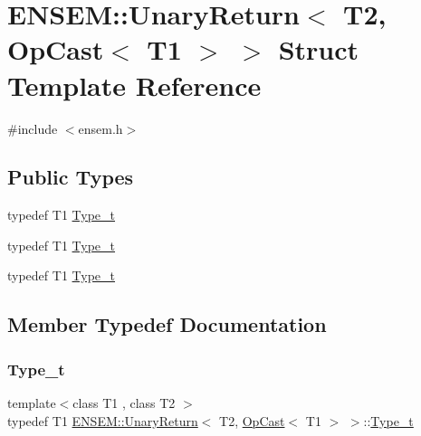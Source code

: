 \hypertarget{structENSEM_1_1UnaryReturn_3_01T2_00_01OpCast_3_01T1_01_4_01_4}{}\section{E\+N\+S\+EM\+:\+:Unary\+Return$<$ T2, Op\+Cast$<$ T1 $>$ $>$ Struct Template Reference}
\label{structENSEM_1_1UnaryReturn_3_01T2_00_01OpCast_3_01T1_01_4_01_4}


{\ttfamily \#include $<$ensem.\+h$>$}

\subsection*{Public Types}
\begin{DoxyCompactItemize}
\item 
typedef T1 \mbox{\hyperlink{structENSEM_1_1UnaryReturn_3_01T2_00_01OpCast_3_01T1_01_4_01_4_a0b016ddfbfa2d0867b9ea61f5768aa06}{Type\+\_\+t}}
\item 
typedef T1 \mbox{\hyperlink{structENSEM_1_1UnaryReturn_3_01T2_00_01OpCast_3_01T1_01_4_01_4_a0b016ddfbfa2d0867b9ea61f5768aa06}{Type\+\_\+t}}
\item 
typedef T1 \mbox{\hyperlink{structENSEM_1_1UnaryReturn_3_01T2_00_01OpCast_3_01T1_01_4_01_4_a0b016ddfbfa2d0867b9ea61f5768aa06}{Type\+\_\+t}}
\end{DoxyCompactItemize}


\subsection{Member Typedef Documentation}
\mbox{\label{structENSEM_1_1UnaryReturn_3_01T2_00_01OpCast_3_01T1_01_4_01_4_a0b016ddfbfa2d0867b9ea61f5768aa06}} 
\subsubsection{\texorpdfstring{Type\_t}{Type\_t}\hspace{0.1cm}{\footnotesize\ttfamily [1/3]}}
{\footnotesize\ttfamily template$<$class T1 , class T2 $>$ \\
typedef T1 \mbox{\hyperlink{structENSEM_1_1UnaryReturn}{E\+N\+S\+E\+M\+::\+Unary\+Return}}$<$ T2, \mbox{\hyperlink{structENSEM_1_1OpCast}{Op\+Cast}}$<$ T1 $>$ $>$\+::\mbox{\hyperlink{structENSEM_1_1UnaryReturn_3_01T2_00_01OpCast_3_01T1_01_4_01_4_a0b016ddfbfa2d0867b9ea61f5768aa06}{Type\+\_\+t}}}

